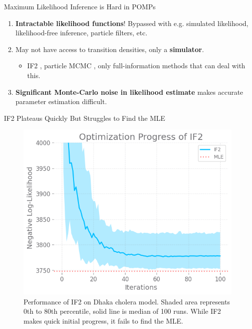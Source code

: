 \documentclass{beamer}
\begin{document}
\begin{frame}{Maximum Likelihood Inference is Hard in POMPs}
    
\begin{enumerate}
    \item \textbf{Intractable likelihood functions}! Bypassed with e.g. simulated likelihood, likelihood-free inference, particle filters, etc. 
    \item \pause May not have access to transition densities, only a \textbf{simulator}. 
    \begin{itemize}
        \item \pause IF2 \citep{ionides15}, particle MCMC \citep{andrieu10}, only full-information methods that can deal with this.
    \end{itemize}
    \item \pause \textbf{Significant Monte-Carlo noise in likelihood estimate} makes accurate parameter estimation difficult.
\end{enumerate}
\end{frame}

\begin{frame}{IF2 Plateaus Quickly But Struggles to Find the MLE}
\begin{figure}
    \centering
    \includegraphics[scale=0.5]{imgs/095/if2fail.png}
    \caption{Performance of IF2 on \cite{king08} Dhaka cholera model. Shaded area represents 0th to 80th percentile, solid line is median of 100 runs. While IF2 makes quick initial progress, it fails to find the MLE.}
    \label{fig:if2fail}
\end{figure}
\end{frame}
\end{document}
